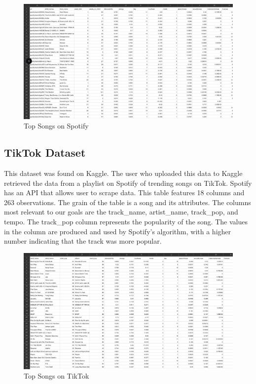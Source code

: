 \documentclass[
  letterpaper,
  DIV=11,
  numbers=noendperiod]{scrreprt}
\begin{document}
\begin{figure}[H]

{\centering \includegraphics[width=5.82292in,height=\textheight]{images/spotify_songs_screenshot.jpg}

}

\caption{Top Songs on Spotify}

\end{figure}%

\subsection{TikTok Dataset}

This dataset was found on Kaggle. The user who uploaded this data to
Kaggle retrieved the data from a playlist on Spotify of trending songs
on TikTok. Spotify has an API that allows user to scrape data. This
table features 18 columns and 263 observations. The grain of the table
is a song and its attributes. The columns most relevant to our goals are
the track\_name, artist\_name, track\_pop, and tempo. The track\_pop
column represents the popularity of the song. The values in the column
are produced and used by Spotify's algorithm, with a higher number
indicating that the track was more popular.

\begin{figure}[H]

{\centering \includegraphics[width=5.86458in,height=\textheight]{images/tiktok_songs_screenshot.jpg}

}

\caption{Top Songs on TikTok}

\end{figure}%
\end{document}
